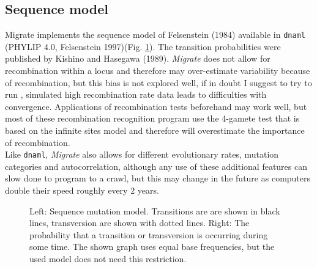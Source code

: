 \subsection{Sequence model}
Migrate implements the sequence model of Felsenstein (1984)  available in {\tt dnaml} (PHYLIP 4.0, Felsenstein 1997)(Fig. \ref{SEQFIG}). The transition probabilities were published by Kishino and Hasegawa (1989).  {\it Migrate} does not allow for recombination within a locus and therefore may over-estimate variability because of recombination, but this bias is not explored well, if in doubt I suggest to try to run \migrate, simulated high recombination rate data leads to difficulties with convergence. Applications of recombination tests beforehand may work well, but most of these recombination recognition program use the 4-gamete test that is based on the infinite sites model and therefore will overestimate the importance of recombination.\\
Like {\tt dnaml}, {\it Migrate} also allows for different evolutionary rates, mutation categories and autocorrelation, although
any use of these additional features can slow done to program to a crawl, but this may change
in the future as computers double their speed roughly every 2 years.
\begin{figure}[b]
\begin{center}
\end{center}
\caption{Left: Sequence mutation model. 
Transitions are are shown in black lines, transversion are 
shown with dotted lines.
Right: The probability that a transition or transversion is occurring during some time.
The shown graph uses equal base frequencies, but the used model does not need this restriction.}
\label{SEQFIG}
\end{figure}
